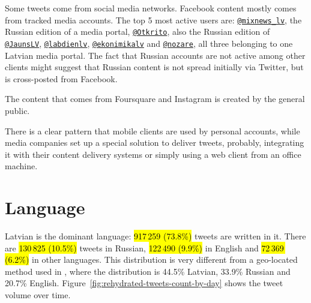 \documentclass{IOS-Book-Article}
\makeatletter
\newcommand{\sn}[1]{\href{https://twitter.com/#1}{\texttt{@#1}}}
\makeatother
\begin{document}


Some tweets come from social media networks. Facebook content mostly comes from tracked media accounts. The top 5 most active users are: \sn{mixnews\_lv}, the Russian edition of a media portal, \sn{Otkrito}, also the Russian edition of \sn{JaunsLV}, \sn{labdienlv}, \sn{ekonimikalv} and \sn{nozare}, all three belonging to one Latvian media portal. The fact that Russian accounts are not active among other clients might suggest that Russian content is not spread initially via Twitter, but is cross-posted from Facebook.

The content that comes from Foursquare and Instagram is created by the general public.

There is a clear pattern that mobile clients are used by personal accounts, while media companies set up a special solution to deliver tweets, probably, integrating it with their content delivery systems or simply using a web client from an office machine.


\section{Language}
\label{sec:language}



Latvian is the dominant language: \hl{917\,259 (73.8\%)} tweets are written in it.\footnotemark{} There are \hl{130\,825 (10.5\%)} tweets in Russian, \hl{122\,490 (9.9\%)} in English and \hl{72\,369\, (6.2\%)} in other languages. This distribution is very different from a geo-located method used in \cite{milajevs:2017:BUCC}, where the distribution is 44.5\% Latvian, 33.9\% Russian and 20.7\% English. Figure~\ref{fig:rehydrated-tweets-count-by-day} shows the tweet volume over time.
\end{document}
